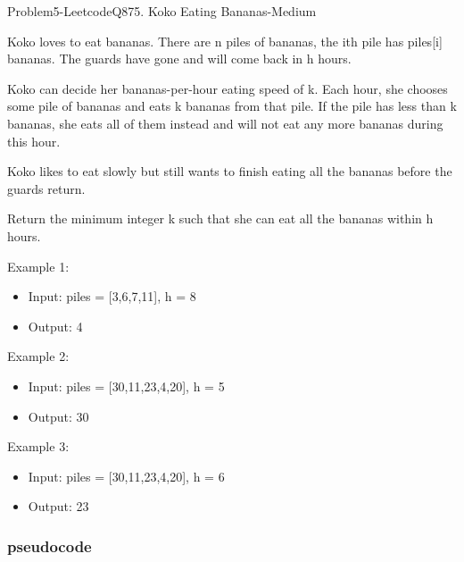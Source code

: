 \documentclass[11pt]{article}
\providecommand{\tightlist}{%
      \setlength{\itemsep}{0pt}\setlength{\parskip}{0pt}}
\begin{document}
    Problem5-LeetcodeQ875. Koko Eating Bananas-Medium

Koko loves to eat bananas. There are n piles of bananas, the ith pile
has piles{[}i{]} bananas. The guards have gone and will come back in h
hours.

Koko can decide her bananas-per-hour eating speed of k. Each hour, she
chooses some pile of bananas and eats k bananas from that pile. If the
pile has less than k bananas, she eats all of them instead and will not
eat any more bananas during this hour.

Koko likes to eat slowly but still wants to finish eating all the
bananas before the guards return.

Return the minimum integer k such that she can eat all the bananas
within h hours.

Example 1:

\begin{itemize}
\tightlist
\item
  Input: piles = {[}3,6,7,11{]}, h = 8
\item
  Output: 4
\end{itemize}

Example 2:

\begin{itemize}
\tightlist
\item
  Input: piles = {[}30,11,23,4,20{]}, h = 5
\item
  Output: 30
\end{itemize}

Example 3:

\begin{itemize}
\tightlist
\item
  Input: piles = {[}30,11,23,4,20{]}, h = 6
\item
  Output: 23
\end{itemize}

    \subsubsection{pseudocode}\label{pseudocode}
\end{document}
